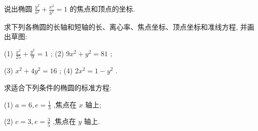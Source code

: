 \documentclass[lang=cn,newtx,10pt,scheme=chinese]{elegantbook}
\begin{document}
\begin{problemset}[练习]

\item 说出椭圆 \(\frac{{y}^{2}}{{a}^{2}} + \frac{{x}^{2}}{{b}^{2}} = 1\) 的焦点和顶点的坐标.

\item 求下列各椭圆的长轴和短轴的长、离心率、焦点坐标、顶点坐标和准线方程, 并画出草图:

(1) \(\frac{{x}^{2}}{25} + \frac{{y}^{2}}{9} = 1\) ; (2) \(9{x}^{2} + {y}^{2} = {81}\) ;

(3) \({x}^{2} + 4{y}^{2} = {16}\) ; (4) \(2{x}^{2} = 1 - {y}^{2}\) .

\item 求适合下列条件的椭圆的标准方程:

(1) \(a = 6,e = \frac{1}{3}\) ,焦点在 \(x\) 轴上;

(2) \(c = 3,e = \frac{3}{5}\) ,焦点在 \(y\) 轴上.

\end{problemset}
\end{document}
